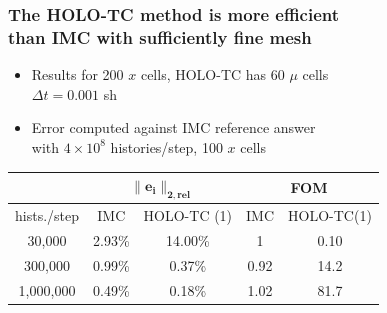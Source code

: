 \documentclass[xcolor=dvipsnames,hyperref={pdfpagelabels=false},unknownkeysallowed]{beamer}
\newcommand{\colb}[1]{{\color{blue} #1}}
\newcommand{\colG}[1]{{\color{Gray!110} #1}}
\newcommand{\colr}[1]{{\color{red} #1}}
\newlength{\wideitemsep}
\let\olditem\item
\renewcommand{\item}{\setlength{\itemsep}{\wideitemsep}\olditem}
\begin{document}
\begin{frame}
    \frametitle{The HOLO-TC method is more efficient  \\ than IMC with sufficiently fine mesh}
    \begin{itemize}
        \item Results for 200 $x$ cells, HOLO-TC has 60 $\mu$ cells \\ \colG{ $\Delta t =
            0.001$ sh}
        \item Error computed against IMC reference answer \\  with $4\times10^8$
            histories/step, 100 $x$ cells
    \end{itemize}
    \begin{table}
\begin{tabular}{|c|cc|cc|}\cline{2-5}
    \multicolumn{1}{c|}{}       & \multicolumn{2}{|c|}{$\mathbf{\|e_i\|_{2,rel}}$} &
    \multicolumn{2}{|c|}{\textbf{FOM}} \\ \hline
hists./step   & IMC     & HOLO-TC (1) &    IMC   & HOLO-TC(1)  \\ \hline
    30,000     & 2.93\%  & \colr{14.00\%}    & 1      &  0.10      \\
  300,000     & 0.99\%  & 0.37\%    & 0.92   &  14.2      \\ 
    1,000,000   & 0.49\%  &\colb{ 0.18\% }   & 1.02   & \colb{ 81.7}      \\ \hline
\end{tabular}
\end{table}

\end{frame}
\end{document}
